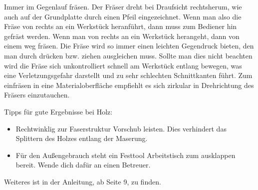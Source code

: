 \documentclass{\basedir/fablab-document}
\begin{document}
Immer im Gegenlauf fräsen. Der Fräser dreht bei Draufsicht rechtsherum, wie auch auf der Grundplatte durch einen Pfeil eingezeichnet. Wenn man also die Fräse von rechts an ein Werkstück heranführt, dann muss zum Bediener hin gefräst werden. Wenn man von rechts an ein Werkstück herangeht, dann von einem weg fräsen. Die Fräse wird so immer einen leichten Gegendruck bieten, den man durch drücken bzw. ziehen ausgleichen muss. Sollte man dies nicht beachten wird die Fräse sich unkontrolliert schnell am Werkstück entlang bewegen, was eine Verletzungsgefahr darstellt und zu sehr schlechten Schnittkanten führt. Zum einfräsen in eine Materialoberfläche empfiehlt es sich zirkular in Drehrichtung des Fräsers einzutauchen.

Tipps für gute Ergebnisse bei Holz:
\begin{itemize}
    \item Rechtwinklig zur Faserstruktur Vorschub leisten. Dies verhindert das Splittern des Holzes entlang der Maserung.
    \item Für den Außengebrauch steht ein Festtool Arbeitstisch zum ausklappen bereit. Wende dich dafür an einen Betreuer.
\end{itemize}

Weiteres ist in der Anleitung, ab Seite 9, zu finden.
\end{document}
